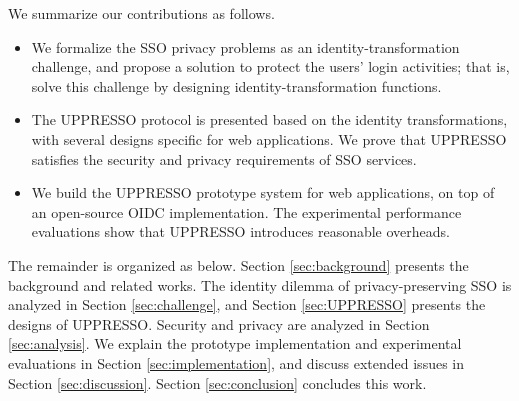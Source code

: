 %
%
We summarize our contributions as follows.
\vspace{-\topsep}\begin{itemize}
\setlength{\topsep}{0pt}
\setlength{\partopsep}{0pt}
\setlength{\itemsep}{0pt}
\setlength{\parsep}{0pt}
\setlength{\parskip}{0pt}
\item We formalize the SSO privacy problems as an identity-transformation challenge,
    and
propose a  solution to protect the users' login activities;
    that is, solve this challenge by designing identity-transformation functions.
\item
The UPPRESSO protocol is presented based on the identity transformations,
    with several designs specific for web applications.
We prove that UPPRESSO satisfies the security and privacy requirements of SSO services.


\item
We build the UPPRESSO prototype system for web applications,
    on top of an open-source OIDC implementation.
The experimental performance evaluations show that UPPRESSO introduces reasonable overheads.
\end{itemize}


The remainder is organized as below.
Section \ref{sec:background} presents
    the background and related works.
The identity dilemma of privacy-preserving SSO is analyzed  in Section \ref{sec:challenge},
    and Section \ref{sec:UPPRESSO} presents the designs of UPPRESSO.
Security and privacy are analyzed in Section \ref{sec:analysis}.
We explain the prototype implementation and experimental evaluations in Section \ref{sec:implementation},
 and discuss extended issues in Section \ref{sec:discussion}.
Section \ref{sec:conclusion} concludes this work.

